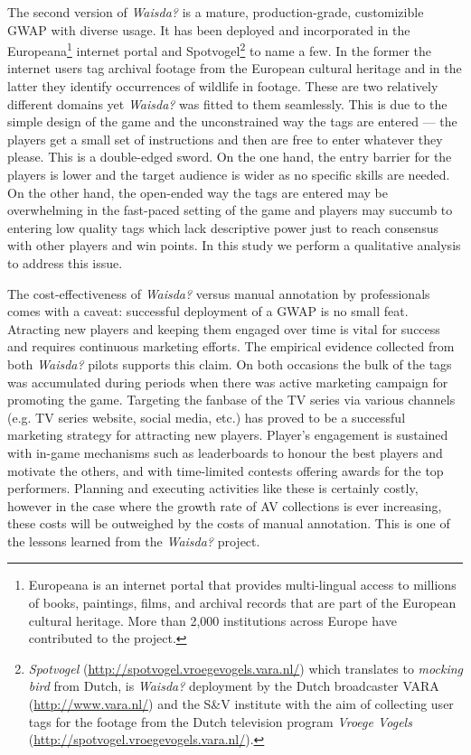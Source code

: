 The second version of \textit{Waisda?} is a mature, production-grade, customizible GWAP with diverse usage. It has been deployed and incorporated in the Europeana\footnote{Europeana is an internet portal that provides multi-lingual access to millions of books, paintings, films, and archival records that are part of the European cultural heritage. More than 2,000 institutions across Europe have contributed to the project.} internet portal and Spotvogel\footnote{\textit{Spotvogel} (\url{http://spotvogel.vroegevogels.vara.nl/}) which translates to \textit{mocking bird} from Dutch, is \textit{Waisda?} deployment by the Dutch broadcaster VARA (\url{http://www.vara.nl/}) and the S\&V institute with the aim of collecting user tags for the footage from the Dutch television program \textit{Vroege Vogels} (\url{http://spotvogel.vroegevogels.vara.nl/}).} to name a few. In the former the internet users tag archival footage from the European cultural heritage and in the latter they identify occurrences of wildlife in footage. These are two relatively different domains yet \textit{Waisda?} was fitted to them seamlessly. This is due to the simple design of the game and the unconstrained way the tags are entered --- the players get a small set of instructions and then are free to enter whatever they please. This is a double-edged sword. On the one hand, the entry barrier for the players is lower and the target audience is wider as no specific skills are needed. On the other hand, the open-ended way the tags are entered may be overwhelming in the fast-paced setting of the game and players may succumb to entering low quality tags which lack descriptive power just to reach consensus with other players and win points. In this study we perform a qualitative analysis to address this issue.

The cost-effectiveness of \textit{Waisda?} versus manual annotation by professionals comes with a caveat: successful deployment of a GWAP is no small feat. Atracting new players and keeping them engaged over time is vital for success and requires continuous marketing efforts. The empirical evidence collected from both \textit{Waisda?} pilots supports this claim. On both occasions the bulk of the tags was accumulated during periods when there was active marketing campaign for promoting the game. Targeting the fanbase of the TV series via various channels (e.g. TV series website, social media, etc.) has proved to be a successful marketing strategy for attracting new players. Player's engagement is sustained with in-game mechanisms such as leaderboards to honour the best players and motivate the others, and with time-limited contests offering awards for the top performers. Planning and executing activities like these is certainly costly, however in the case where the growth rate of AV collections is ever increasing, these costs will be outweighed by the costs of manual annotation. This is one of the lessons learned from the \textit{Waisda?} project.


